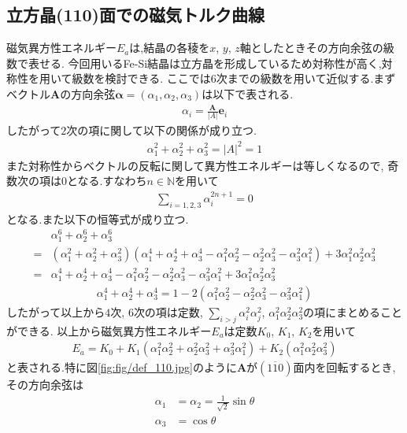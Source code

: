 \subsection{立方晶(110)面での磁気トルク曲線}
\label{subsec:torque}
磁気異方性エネルギー$E_a$は,結晶の各稜を$x$, $y$, $z$軸としたときその方向余弦の級数で表せる.
今回用いるFe-Si結晶は立方晶を形成しているため対称性が高く,対称性を用いて級数を検討できる.
ここでは6次までの級数を用いて近似する.まずベクトル$\bm{A}$の方向余弦$\bm{\alpha}=(\alpha_1,\alpha_2,\alpha_3)$は以下で表される.
\begin{align}
  \alpha_i=\frac{\bm{A}}{|A|}\bm{e}_i
\end{align}
したがって$2$次の項に関して以下の関係が成り立つ.
\begin{align}
  \alpha_1^2+\alpha_2^2+\alpha_3^2=|A|^2=1
\end{align}
また対称性からベクトルの反転に関して異方性エネルギーは等しくなるので,
奇数次の項は$0$となる.すなわち$n\in\mathbb{N}$を用いて
\begin{align}
  \sum_{i=1,2,3}\alpha_i^{2n+1}=0
\end{align}
となる.また以下の恒等式が成り立つ.
\begin{align}
  &\alpha_1^6+\alpha_2^6+\alpha_3^6\nonumber\\
  =&(\alpha_1^2+\alpha_2^2+\alpha_3^2)(\alpha_1^4+\alpha_2^4+\alpha_3^4-\alpha_1^2\alpha_2^2-\alpha_2^2\alpha_3^2-\alpha_3^2\alpha_1^2)+3\alpha_1^2\alpha_2^2\alpha_3^2\nonumber\\
  =&\alpha_1^4+\alpha_2^4+\alpha_3^4-\alpha_1^2\alpha_2^2-\alpha_2^2\alpha_3^2-\alpha_3^2\alpha_1^2+3\alpha_1^2\alpha_2^2\alpha_3^2
\end{align}
\begin{align}
  \alpha_1^4+\alpha_2^4+\alpha_3^4=1-2(\alpha_1^2\alpha_2^2-\alpha_2^2\alpha_3^2-\alpha_3^2\alpha_1^2)
\end{align}
したがって以上から$4$次, $6$次の項は定数, $\sum_{i>j}\alpha_i^2\alpha_j^2$, $\alpha_1^2\alpha_2^2\alpha_3^2$の項にまとめることができる.
以上から磁気異方性エネルギー$E_a$は定数$K_0$, $K_1$, $K_2$を用いて
\begin{align}
  E_a=K_0+K_1(\alpha_1^2\alpha_2^2+\alpha_2^2\alpha_3^2+\alpha_3^2\alpha_1^2)+K_2(\alpha_1^2\alpha_2^2\alpha_3^2)
\end{align}
と表される.特に図\ref{fig:fig/def_110.jpg}のように$\bm{A}$が$(1\overline{1}0)$面内を回転するとき,その方向余弦は
\begin{align}
  \alpha_1&=\alpha_2=\frac{1}{\sqrt{2}}\sin\theta\\
  \alpha_3&=\cos\theta
\end{align}
